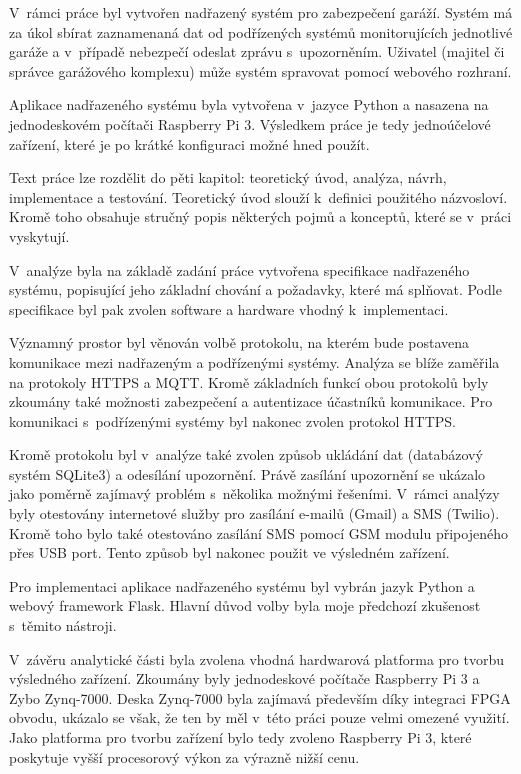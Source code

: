 
V~rámci práce byl vytvořen nadřazený systém pro zabezpečení garáží. Systém má za úkol sbírat zaznamenaná dat od podřízených systémů monitorujících jednotlivé garáže a v~případě nebezpečí odeslat zprávu s~upozorněním. Uživatel (majitel či správce garážového komplexu) může systém spravovat pomocí webového rozhraní.

Aplikace nadřazeného systému byla vytvořena v~jazyce Python a nasazena na jednodeskovém počítači Raspberry Pi 3. Výsledkem práce je tedy jednoúčelové zařízení, které je po krátké konfiguraci možné hned použít.

Text práce lze rozdělit do pěti kapitol: teoretický úvod, analýza, návrh, implementace a testování. Teoretický úvod slouží k~definici použitého názvosloví. Kromě toho obsahuje stručný popis některých pojmů a konceptů, které se v~práci vyskytují.

V~analýze byla na základě zadání práce vytvořena specifikace nadřazeného systému, popisující jeho základní chování a požadavky, které má splňovat. Podle specifikace byl pak zvolen software a hardware vhodný k~implementaci.

Významný prostor byl věnován volbě protokolu, na kterém bude postavena komunikace mezi nadřazeným a podřízenými systémy. Analýza se blíže zaměřila na protokoly HTTPS a MQTT. Kromě základních funkcí obou protokolů byly zkoumány také možnosti zabezpečení a autentizace účastníků komunikace. Pro komunikaci s~podřízenými systémy byl nakonec zvolen protokol HTTPS.

Kromě protokolu byl v~analýze také zvolen způsob ukládání dat (databázový systém SQLite3) a odesílání upozornění. Právě zasílání upozornění se ukázalo jako poměrně zajímavý problém s~několika možnými řešeními. V~rámci analýzy byly otestovány internetové služby pro zasílání e-mailů (Gmail) a SMS (Twilio). Kromě toho bylo také otestováno zasílání SMS pomocí GSM modulu připojeného přes USB port. Tento způsob byl nakonec použit ve výsledném zařízení.

Pro implementaci aplikace nadřazeného systému byl vybrán jazyk Python a webový framework Flask. Hlavní důvod volby byla moje předchozí zkušenost s~těmito nástroji.

V~závěru analytické části byla zvolena vhodná hardwarová platforma pro tvorbu výsledného zařízení. Zkoumány byly jednodeskové počítače Raspberry Pi 3 a Zybo Zynq-7000. Deska Zynq-7000 byla zajímavá především díky integraci FPGA obvodu, ukázalo se však, že ten by měl v~této práci pouze velmi omezené využití. Jako platforma pro tvorbu zařízení bylo tedy zvoleno Raspberry Pi 3, které poskytuje vyšší procesorový výkon za výrazně nižší cenu.

